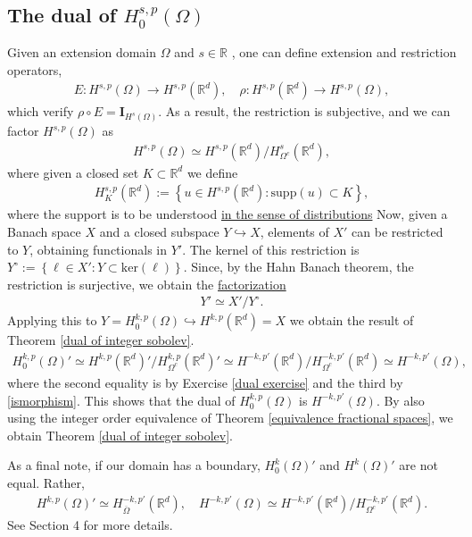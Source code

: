 \documentclass[
    a4paper,
    DIV=14,
    abstract=true,
    numbers=noenddot
]
{scrartcl}
\theoremstyle{definition}
\newcommand{\set}[1]{\left\{#1\right\}}
\newcommand{\Id}{\bm{I}}\renewcommand{\ker}{\bm{ker}}\newcommand{\supp}[1]{\bm{supp}(#1)}\renewcommand{\tr}[1]{\mathrm{tr}\left(#1\right)}
\newcommand{\rm}[1]{\mathrm{#1}}
\newcommand{\R}{\mathbb{R}}
\begin{document}
\subsection{The dual of $H^{s,p}_0(\Omega)$}
Given an extension domain $\Omega $ and $s \in \R$ , one can define extension and restriction operators,
\begin{align*}
    E:H^{s,p}(\Omega ) \to H^{s,p}(\R^d), \quad \rho: H^{s,p}(\R^d) \to H^{s,p}(\Omega ),
\end{align*}
which verify $\rho \circ E = \Id_{H^s(\Omega )}$. As a result, the restriction is subjective, and we can factor $H^{s,p}(\Omega )$ as
\begin{align}\label{ismorphism}
    H^{s,p}(\Omega )\simeq H^{s,p}(\R^d)\slash H^s_{\Omega^c}(\R^d ),
\end{align}
where given a closed set $K \subset \R^d$ we define
\begin{align*}
    H^{s,p}_K(\R^d):= \set{u \in H^{s,p}(\R^d): \rm{supp}(u) \subset K},
\end{align*}
where the support is to be understood \href{https://nowheredifferentiable.com/2023-07-12-PDEs-3-Sobolev_spaces/#:~:text=Support%20of%20a%20distribution}{in the sense of distributions}
Now, given a Banach space $X$ and a closed subspace $Y \hookrightarrow X$, elements of $X'$ can be restricted to $Y$, obtaining functionals in $Y'$. The kernel of this restriction is $Y^\circ:=\set{\ell \in X': Y \subset \rm{ker}(\ell)}$. Since, by the Hahn Banach theorem, the restriction is surjective, we obtain the \href{https://math.la.asu.edu/~quigg/teach/courses/578/2008/notes/adjoints.pdf}{factorization}
\begin{align}\label{dual isomormphism}
    Y' \simeq X'\slash Y^\circ.
\end{align}
Applying this to $Y= H^{k,p}_0(\Omega )\hookrightarrow H^{k,p}(\R^d) =X$ we obtain the result of Theorem \ref{dual of integer sobolev}.
\begin{align*}
    H^{k,p}_0(\Omega )' \simeq H^{k,p}(\R^d)'\slash H^{k,p}_{\Omega^c}(\R^d)'\simeq H^{-k,p'}(\R^d)\slash H^{-k,p'}_{\Omega^c}(\R^d )\simeq H^{-k,p'}(\Omega ),
\end{align*}
where the second equality is by Exercise \ref{dual exercise} and the third by \eqref{ismorphism}.
This shows that the dual of $H^{k,p}_0(\Omega )$ is $H^{-k,p'}(\Omega )$. By also using the integer order equivalence of Theorem \ref{equivalence fractional spaces}, we obtain  Theorem \ref{dual of integer sobolev}.

As a final note, if our domain has a boundary, $H_0^k(\Omega )'$ and $H^k(\Omega )'$ are not equal. Rather,
\begin{align*}
    H^{k,p}(\Omega )'\simeq H_{\overline{\Omega } }^{-k,p'}(\R^d), \quad H^{-k,p'}(\Omega ) \simeq H^{-k,p'}(\R^d)\slash H^{-k,p'}_{{\Omega }^c }(\R^d).
\end{align*}
See \cite{taylor2013partial} Section 4 for more details.
\end{document}
